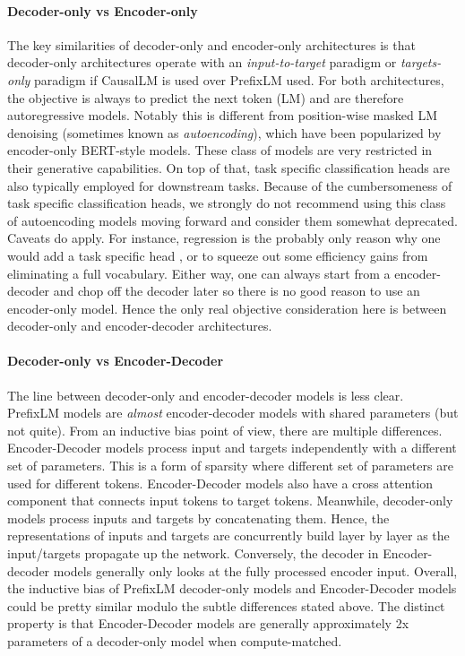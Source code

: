 \documentclass[10pt]{article}
\begin{document}
\paragraph{Decoder-only vs Encoder-only} The key similarities of decoder-only and encoder-only architectures is that decoder-only architectures operate with an \textit{input-to-target} paradigm or \textit{targets-only} paradigm if CausalLM is used over PrefixLM used. For both architectures, the objective is always to predict the next token (LM) and are therefore autoregressive models. Notably this is different from position-wise masked LM denoising (sometimes known as \textit{autoencoding}), which have been popularized by encoder-only BERT-style models. These class of models are very restricted in their generative capabilities. On top of that, task specific classification heads are also typically employed for downstream tasks. Because of the cumbersomeness of task specific classification heads, we strongly do not recommend using this class of autoencoding models moving forward and consider them somewhat deprecated. Caveats do apply. For instance, regression is the probably only reason why one would add a task specific head \citep{lees2022new}, or to squeeze out some efficiency gains from eliminating a full vocabulary. Either way, one can always start from a encoder-decoder and chop off the decoder later so there is no good reason to use an encoder-only model. Hence the only real objective consideration here is between decoder-only and encoder-decoder architectures.

\paragraph{Decoder-only vs Encoder-Decoder}
The line between decoder-only and encoder-decoder models is less clear. PrefixLM models are \textit{almost} encoder-decoder models with shared parameters (but not quite). From an inductive bias point of view, there are multiple differences. Encoder-Decoder models process input and targets independently with a different set of parameters. This is a form of sparsity where different set of parameters are used for different tokens. Encoder-Decoder models also have a cross attention component that connects input tokens to target tokens. Meanwhile, decoder-only models process inputs and targets by concatenating them. Hence, the representations of inputs and targets are concurrently build layer by layer as the input/targets propagate up the network. Conversely, the decoder in Encoder-decoder models generally only looks at the fully processed encoder input. Overall, the inductive bias of PrefixLM decoder-only models and Encoder-Decoder models could be pretty similar modulo the subtle differences stated above. The distinct property is that Encoder-Decoder models are generally approximately 2x parameters of a decoder-only model when compute-matched.
\end{document}
